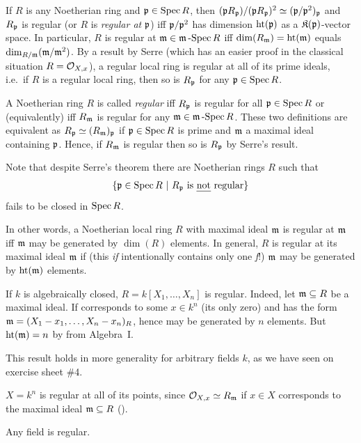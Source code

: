 \documentclass[a4paper,parskip=half,numbers=enddot, DIV=12]{scrreprt}
\begin{document}
\begin{rem}
    If $R$ is any Noetherian ring and $\mathfrak{p}\in \operatorname{Spec} R$, then $(\mathfrak{p} R_{\mathfrak{p}})/(\mathfrak{p} R_{\mathfrak{p}})^2 \simeq (\mathfrak{p}/\mathfrak{p}^2)_{\mathfrak{p}}$ and $R_{\mathfrak{p}}$ is regular (or $R$ is \emph{regular at} $\mathfrak{p}$) iff $\mathfrak{p}/\mathfrak{p}^2$ has dimension $\operatorname{ht}(\mathfrak{p})$ as a $\mathfrak{K}(\mathfrak{p})$-vector space. In particular, $R$ is regular at $\mathfrak{m}\in\mathfrak{m}\operatorname{-Spec} R$ iff $\dim(R_{\mathfrak{m}}) = \operatorname{ht}(\mathfrak{m})$ equals $\dim_{R/\mathfrak{m}} (\mathfrak{m}/\mathfrak{m}^2)$. By a result by Serre (which has an easier proof in the classical situation $R=\mathcal{O}_{X,x}$), a regular local ring is regular at all of its prime ideals, i.e.\ if $R$ is a regular local ring, then so is $R_{\mathfrak{p}}$ for any $\mathfrak{p}\in \operatorname{Spec} R$. 
    
    A Noetherian ring $R$ is called \emph{regular} iff $R_{\mathfrak{p}}$ is regular for all $\mathfrak{p}\in\operatorname{Spec} R$ or (equivalently) iff $R_{\mathfrak{m}}$ is regular for any $\mathfrak{m}\in\mathfrak{m}\operatorname{-Spec} R$. These two definitions are equivalent as $R_{\mathfrak{p}}\simeq (R_{\mathfrak{m}})_{\mathfrak{p}}$ if $\mathfrak{p}\in\operatorname{Spec} R$ is prime and $\mathfrak{m}$ a maximal ideal containing $\mathfrak{p}$. Hence, if $R_{\mathfrak{m}}$ is regular then so is $R_{\mathfrak{p}}$ by Serre's result. 
    
    Note that despite Serre's theorem there are Noetherian rings $R$ such that 
    \begin{align*}
    	\left\{\mathfrak{p}\in\operatorname{Spec} R\ \middle|\  R_{\mathfrak{p}}\text{ is \emph{not} regular}\right\}
    \end{align*}
    fails to be closed in $\operatorname{Spec} R$.
\end{rem}
\begin{rem*}
    In other words, a Noetherian local ring $R$ with maximal ideal $\mathfrak{m}$ is regular at $\mathfrak{m}$ iff $\mathfrak{m}$ may be generated by $\dim (R)$ elements. In general, $R$ is regular at its maximal ideal $\mathfrak{m}$ if (this \emph{if} intentionally contains only one \emph{f}!) $\mathfrak{m}$ may be generated by $\operatorname{ht}(\mathfrak{m})$ elements.
\end{rem*}
\begin{example*}
    \begin{alphanumerate}
        \item 
            If $k$ is algebraically closed, $R= k[X_1,\ldots,X_n]$ is regular. Indeed, let $\mathfrak{m}\subseteq R$ be a maximal ideal. If corresponds to some $x\in k^n$ (its only zero) and has the form $\mathfrak{m} = ( X_1-x_1,\ldots, X_n-x_n)_R$, hence may be generated by $n$ elements. But $\operatorname{ht}(\mathfrak{m}) = n$ by \cite[Theorem~10]{alg1} from Algebra~I.
            
            This result holds in more generality for arbitrary fields $k$, as we have seen on exercise sheet \#4.
        \item 
            $X=k^n$ is regular at all of its points, since $\mathcal{O}_{X,x} \simeq R_{\mathfrak{m}}$ if $x\in X$ corresponds to the maximal ideal $\mathfrak{m}\subseteq R$ (\cite[Proposition~2.3.4]{alg1}).
        \item 
            Any field is regular.
    \end{alphanumerate}
\end{example*}
\end{document}
